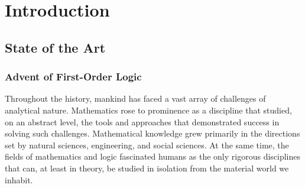 
\chapter{Introduction}





\section{State of the Art}
\label{sec:sota}


\subsection{Advent of First-Order Logic}


Throughout the history, mankind has faced a vast array of challenges of analytical nature.
Mathematics rose to prominence as a discipline that studied, on an abstract level, the tools and approaches that demonstrated success in solving such challenges.
Mathematical knowledge grew primarily in the directions set by
natural sciences, engineering, and social sciences.
At the same time, the fields of mathematics and logic
fascinated humans
as the only rigorous disciplines that can, at least in theory, be studied in isolation from the material world we inhabit.

